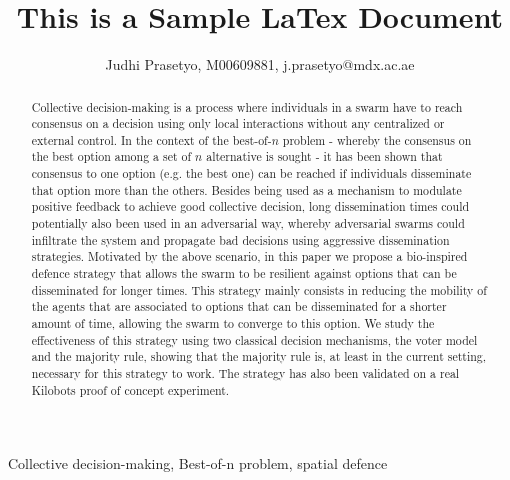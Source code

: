 \documentclass[journal]{IEEEtran}
\begin{document}
\title{This is a Sample LaTex Document}

\author{Judhi Prasetyo, M00609881, j.prasetyo@mdx.ac.ae}


\maketitle

\begin{abstract}
Collective decision-making is a process where individuals in a swarm have to reach consensus on a decision using only local interactions without any centralized or external control. In the context of the best-of-$n$ problem - whereby the consensus on the best option among a set of $n$ alternative is sought - it has been shown that consensus to one option (e.g. the best one) can be reached if individuals disseminate that option more than the others.
Besides being used as a mechanism to modulate positive feedback to achieve good collective decision, long dissemination times could potentially also been used in an adversarial way, whereby adversarial swarms could infiltrate the system and propagate bad decisions using aggressive dissemination strategies. Motivated by the above scenario, in this paper we propose a bio-inspired defence strategy that allows the swarm to be resilient against options that can be disseminated for longer times. This strategy mainly consists in reducing the mobility of the agents that are associated to options that can be disseminated for a shorter amount of time, allowing the swarm to converge to this option. 
We study the effectiveness of this strategy using two classical decision mechanisms, the voter model and the majority rule, showing that the majority rule is, at least in the current setting, necessary for this strategy to work. The strategy has also been validated on a real Kilobots proof of concept experiment. 
\end{abstract}

\begin{IEEEkeywords}
Collective decision-making, Best-of-n problem, spatial defence
\end{IEEEkeywords}
\end{document}
